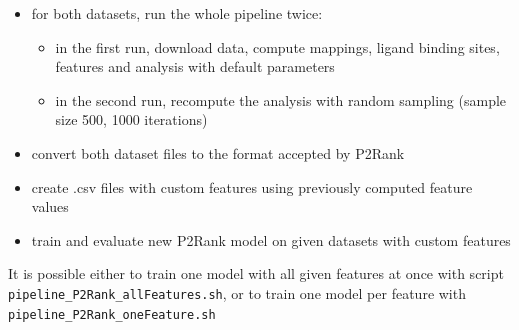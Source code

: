 \begin{itemize}
\item for both datasets, run the whole pipeline twice:
	\begin{itemize}
	\item in the first run, download data, compute mappings, ligand binding sites, features and analysis with default parameters
	\item in the second run, recompute the analysis with random sampling (sample size 500, 1000 iterations)
	\end{itemize}
\item convert both dataset files to the format accepted by P2Rank
\item create .csv files with custom features using previously computed feature values
\item train and evaluate new P2Rank model on given datasets with custom features
\end{itemize}

It is possible either to train one model with all given features at once with script \texttt{pipeline\_P2Rank\_allFeatures.sh}, or to train one model per feature with \texttt{pipeline\_P2Rank\_oneFeature.sh}


